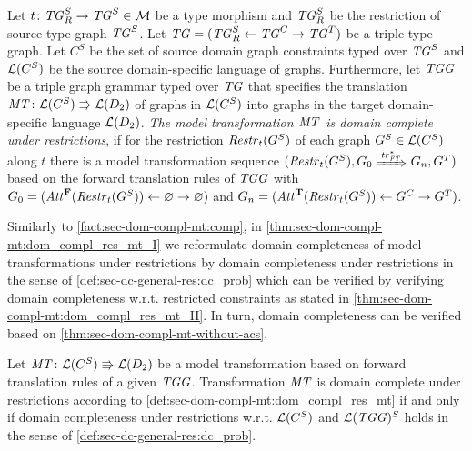 \begin{definition}
\label{def:sec-dom-compl-mt:dom_compl_res_mt}
Let $t\colon \mathit{TG}^S_R \to \mathit{TG}^S \in {\cal M}$ be a type morphism and $\mathit{TG}^S_R$ be the restriction of source type graph $\mathit{TG}^S$.
Let $\mathit{TG}=(\mathit{TG}^S_R \gets \mathit{TG}^C \to \mathit{TG}^T)$ be a triple type graph.
Let $C^S$ be the set of source domain graph constraints typed over $\mathit{TG}^S$ and $\mathcal{L}(C^S)$ be the source domain-specific language of graphs. 
Furthermore, let $\mathit{TGG}$ be a triple graph grammar typed over $\mathit{TG}$ that specifies the translation $\mathit{MT}\colon \mathcal{L}(C^S) \Rrightarrow \mathcal{L}(D_2)$ of graphs in $\mathcal{L}(C^S)$ into graphs in the target domain-specific language $\mathcal{L}(D_2)$.
\emph{The model transformation $\mathit{MT}$ is domain complete under restrictions}, if for the restriction $\mathit{Restr}_t(G^S)$ of each graph $G^S \in \mathcal{L}(C^S)$ along $t$ there is a model transformation sequence $(\Restr_t(G^S),G_0 \Trans{\tr^*_\FT} G_n,G^T)$ based on the forward translation rules of $\mathit{TGG}$ with $G_0=(\mathit{Att}^\mathbf{F}(\mathit{Restr}_t(G^S)) \gets \varnothing \to \varnothing)$ and $G_n=(\mathit{Att}^\mathbf{T}(\mathit{Restr}_t(G^S)) \gets G^C \to G^T)$.
\envEndMarker
\end{definition}

Similarly to \cref{fact:sec-dom-compl-mt:comp}, in \cref{thm:sec-dom-compl-mt:dom_compl_res_mt_I} we reformulate domain completeness of model transformations under restrictions by domain completeness under restrictions in the sense of \cref{def:sec-dc-general-res:dc_prob} which can be verified by verifying domain completeness w.r.t. restricted constraints as stated in \cref{thm:sec-dom-compl-mt:dom_compl_res_mt_II}.
In turn, domain completeness can be verified based on \cref{thm:sec-dom-compl-mt-without-acs}.

\begin{theorem}
\label{thm:sec-dom-compl-mt:dom_compl_res_mt_I}
Let $\mathit{MT}\colon \mathcal{L}(C^S) \Rrightarrow \mathcal{L}(D_2)$ be a model transformation based on forward translation rules of a given $\mathit{TGG}$.
Transformation $\mathit{MT}$ is domain complete under restrictions according to \cref{def:sec-dom-compl-mt:dom_compl_res_mt} if and only if domain completeness under restrictions w.r.t. $\mathcal{L}(C^S)$ and $\mathcal{L}(\mathit{TGG})^S$ holds in the sense of \cref{def:sec-dc-general-res:dc_prob}.
\envEndMarker
\end{theorem}

